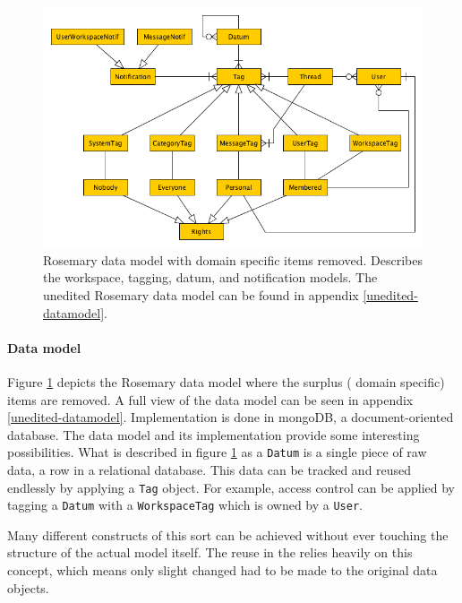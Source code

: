 \begin{figure}[!hb]
	\centering
	\includegraphics[width=1.0\linewidth]{images/datamodel-clean}
	\caption{
		Rosemary data model with domain specific items removed.
		Describes the workspace, tagging, datum, and notification models.
		The unedited Rosemary data model can be found in appendix \ref{unedited-datamodel}.
	}
	\label{fig:reuse-rosemary-dm}
\end{figure}

\paragraph{Data model}
Figure \ref{fig:reuse-rosemary-dm} depicts the Rosemary data model where the surplus (\ie{} domain specific) items are removed.
A full view of the data model can be seen in appendix \ref{unedited-datamodel}.
Implementation is done in mongoDB, a document-oriented database.
The data model and its implementation provide some interesting possibilities.
What is described in figure \ref{fig:reuse-rosemary-dm} as a {\tt Datum} is a single piece of raw data, \ie{} a row in a relational database.
This data can be tracked and reused endlessly by applying a {\tt Tag} object.
For example, access control can be applied by tagging a {\tt Datum} with a {\tt WorkspaceTag} which is owned by a {\tt User}.

Many different constructs of this sort can be achieved without ever touching the structure of the actual model itself.
The reuse in the \ivfsystem{} relies heavily on this concept, which means only slight changed had to be made to the original data objects.
